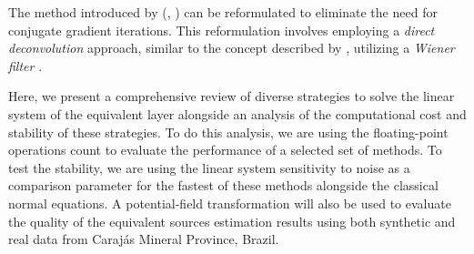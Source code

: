 The method introduced by \citeauthor{takahashi2020} (\citeyear{takahashi2020}, \citeyear{takahashi2022}) can be reformulated to eliminate the need for conjugate gradient iterations. 
This reformulation involves employing a \textit{direct deconvolution} approach, similar to the concept described by \citep[e.g.,][p. 220]{aster_etal2019}, utilizing a \textit{Wiener filter} 
\citep[e.g.,][p. 263]{gonzalez-woods2002}.


Here, we present a comprehensive review of diverse strategies to solve the linear system of the equivalent layer alongside an analysis of the computational cost and stability of these strategies. 
To do this analysis, we are using the floating-point operations count to evaluate the performance of 
a selected set of methods. 
To test the stability, we are using the linear system sensitivity to noise as a comparison parameter for the fastest of these methods alongside the classical normal equations. 
A potential-field transformation will also be used to evaluate the quality of the equivalent sources estimation results using both synthetic and real data from Carajás Mineral Province, Brazil.



